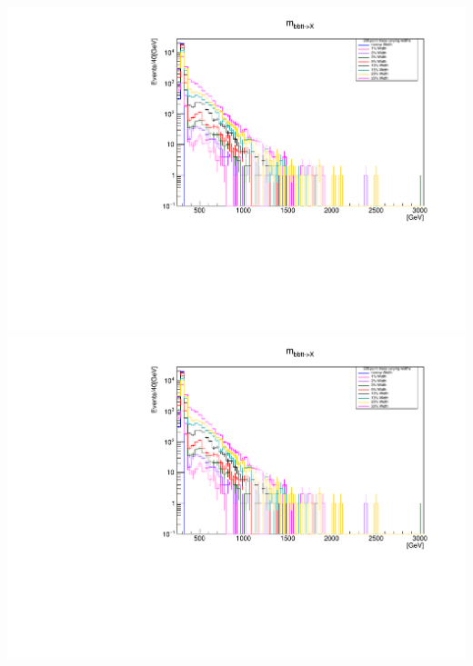 \documentclass[a4wide,10pt]{article}
\begin{document}
\includegraphics[scale=0.50,page=19]{../Pdfs/bb+tt->X_Mass_VaryingWidths.pdf}
\includegraphics[scale=0.50,page=20]{../Pdfs/bb+tt->X_Mass_VaryingWidths.pdf}
\end{document}
